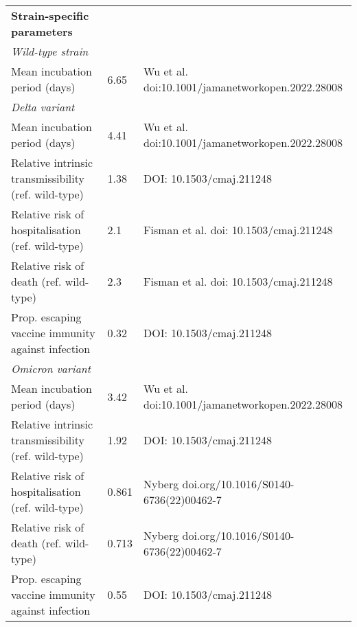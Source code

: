 \begin{table}
{\begin{tabular}{lll}
                   \textbf{Strain-specific parameters} &                              &                                                                    \\
                             \quad \textit{Wild-type strain} &                              &                                                                    \\
                                Mean incubation period (days) &                         6.65 &                   Wu et al. doi:10.1001/jamanetworkopen.2022.28008 \\
                                \quad \textit{Delta variant} &                              &                                                                    \\
                                Mean incubation period (days) &                         4.41 &                   Wu et al. doi:10.1001/jamanetworkopen.2022.28008 \\
         Relative intrinsic transmissibility (ref. wild-type) &                         1.38 &                                           DOI: 10.1503/cmaj.211248 \\
            Relative risk of hospitalisation (ref. wild-type) &                          2.1 &                             Fisman et al. doi: 10.1503/cmaj.211248 \\
                      Relative risk of death (ref. wild-type) &                          2.3 &                             Fisman et al. doi: 10.1503/cmaj.211248 \\
            Prop. escaping vaccine immunity against infection &                         0.32 &                                           DOI: 10.1503/cmaj.211248 \\
                              \quad \textit{Omicron variant} &                              &                                                                    \\
                                Mean incubation period (days) &                         3.42 &                   Wu et al. doi:10.1001/jamanetworkopen.2022.28008 \\
         Relative intrinsic transmissibility (ref. wild-type) &                         1.92 &                                           DOI: 10.1503/cmaj.211248 \\
            Relative risk of hospitalisation (ref. wild-type) &                        0.861 &                       Nyberg doi.org/10.1016/S0140-6736(22)00462-7 \\
                      Relative risk of death (ref. wild-type) &                        0.713 &                       Nyberg doi.org/10.1016/S0140-6736(22)00462-7 \\
            Prop. escaping vaccine immunity against infection &                         0.55 &                                           DOI: 10.1503/cmaj.211248 \\
\bottomrule
\end{tabular}}
\end{table}
